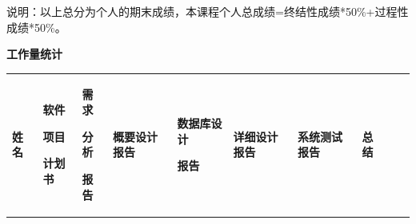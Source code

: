 \documentclass[
]{article}
\begin{document}
说明：以上总分为个人的期末成绩，本课程个人总成绩=终结性成绩*50\%+过程性成绩*50\%。

\textbf{工作量统计}

\begin{longtable}[]{@{}
  >{\centering\arraybackslash}p{}
  >{\centering\arraybackslash}p{}
  >{\centering\arraybackslash}p{}
  >{\centering\arraybackslash}p{}
  >{\centering\arraybackslash}p{}
  >{\centering\arraybackslash}p{}
  >{\centering\arraybackslash}p{}
  >{\centering\arraybackslash}p{}
  >{\centering\arraybackslash}p{}
  >{\centering\arraybackslash}p{}@{}}
\toprule\noalign{}
\begin{minipage}[b]{\linewidth}\centering
\textbf{姓名}
\end{minipage} & \begin{minipage}[b]{\linewidth}\centering
\textbf{软件}

\textbf{项目}

\textbf{计划书}
\end{minipage} & \begin{minipage}[b]{\linewidth}\centering
\textbf{需求}

\textbf{分析}

\textbf{报告}
\end{minipage} & \begin{minipage}[b]{\linewidth}\centering
\textbf{概要设计报告}
\end{minipage} & \begin{minipage}[b]{\linewidth}\centering
\textbf{数据库设计}

\textbf{报告}
\end{minipage} & \begin{minipage}[b]{\linewidth}\centering
\textbf{详细设计报告}
\end{minipage} & \begin{minipage}[b]{\linewidth}\centering
\textbf{系统测试报告}
\end{minipage} & \begin{minipage}[b]{\linewidth}\centering
\textbf{总结}


\end{minipage}
\end{longtable}
\end{document}

